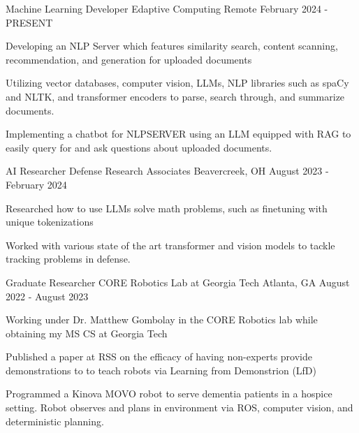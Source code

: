 
\begin{cventries}

\cventry
    {Machine Learning Developer} %
    {Edaptive Computing} %
    {Remote} %
    {February 2024 - PRESENT} %
    {
      \begin{cvitems} %
        \item {Developing an NLP Server which features similarity search, content scanning, recommendation, and generation for uploaded documents}
        \item {Utilizing vector databases, computer vision, LLMs, NLP libraries such as spaCy and NLTK, and transformer encoders to parse, search through, and summarize documents.}
        \item {Implementing a chatbot for NLPSERVER using an LLM equipped with RAG to easily query for and ask questions about uploaded documents.}
      \end{cvitems}
    }
    
\cventry
    {AI Researcher} %
    {Defense Research Associates} %
    {Beavercreek, OH} %
    {August 2023 - February 2024} %
    {
      \begin{cvitems} %
        \item {Researched how to use LLMs solve math problems, such as finetuning with unique tokenizations}
        \item {Worked with various state of the art transformer and vision models to tackle tracking problems in defense.}
      \end{cvitems}
    }

\cventry
    {Graduate Researcher} %
    {CORE Robotics Lab at Georgia Tech} %
    {Atlanta, GA} %
    {August 2022 - August 2023} %
    {
      \begin{cvitems} %
        \item {Working under Dr. Matthew Gombolay in the CORE Robotics lab while obtaining my MS CS at Georgia Tech}
        \item {Published a paper at RSS on the efficacy of having non-experts provide demonstrations to to teach robots via Learning from Demonstrion (LfD)}
        \item {Programmed a Kinova MOVO robot to serve dementia patients in a hospice setting. Robot observes and plans in environment via ROS, computer vision, and deterministic planning.}
      \end{cvitems}
    }


\end{cventries}
